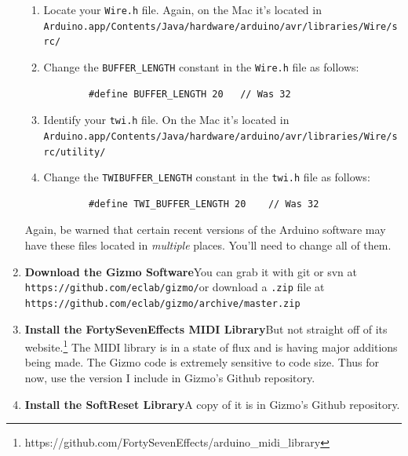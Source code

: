 \documentclass{article}
\begin{document}
\begin{enumerate}
\begin{enumerate}
\item Locate your \texttt{Wire.h} file.  Again, on the Mac it's located in\\
\texttt{Arduino.app/Contents/Java/hardware/arduino/avr/libraries/Wire/src/}

\item Change the \texttt{BUFFER\_LENGTH} constant in the \texttt{Wire.h} file as follows:

\begin{verbatim}
        #define BUFFER_LENGTH 20   // Was 32
\end{verbatim}

\item Identify your \texttt{twi.h} file.  On the Mac it's located in\\
\texttt{Arduino.app/Contents/Java/hardware/arduino/avr/libraries/Wire/src/utility/}

\item Change the \texttt{TWIBUFFER\_LENGTH} constant in the \texttt{twi.h} file as follows:

\begin{verbatim}
        #define TWI_BUFFER_LENGTH 20    // Was 32
\end{verbatim}
\end{enumerate}

Again, be warned that certain recent versions of the Arduino software may have these files located in {\it multiple} places.  You'll need to change all of them.


\item {\bf Download the Gizmo Software}\quad You can grab it with git or svn at\\
\texttt{https:/\!/github.com/eclab/gizmo/}\quad or download a \texttt{.zip} file at\\
\texttt{https:/\!/github.com/eclab/gizmo/archive/master.zip}

\item {\bf Install the FortySevenEffects MIDI Library}\quad But not straight off of its website.\footnote{https:/\!/github.com/FortySevenEffects/arduino\_midi\_library}  The MIDI library is in a state of flux and is having major additions being made.  The Gizmo code is extremely sensitive to code size.  Thus for now, use the version I include in Gizmo's Github repository.

\item {\bf Install the SoftReset Library}\quad A copy of it is in Gizmo's Github repository.


\end{enumerate}
\end{document}
